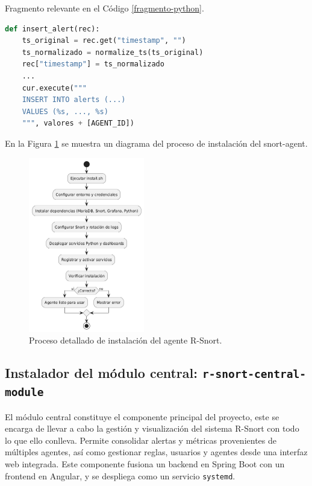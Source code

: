 \documentclass[11pt,a4paper,twoside]{report}
\begin{document}
Fragmento relevante en el Código \ref{fragmento-python}.

\begin{lstlisting}[language=Python, caption={Fragmento de inserción de alerta en ingest\_service.py.}, label={fragmento-python}]
	def insert_alert(rec):
	ts_original = rec.get("timestamp", "")
	ts_normalizado = normalize_ts(ts_original)
	rec["timestamp"] = ts_normalizado
	...
	cur.execute("""
	INSERT INTO alerts (...)
	VALUES (%s, ..., %s)
	""", valores + [AGENT_ID])
\end{lstlisting}

\newpage

En la Figura \ref{fig:bpmn-snort-agent} se muestra un diagrama del proceso de instalación del snort-agent.

\begin{figure}[H]
	\centering
	 \includegraphics[width=0.45\textwidth]{documento/29.png}
	\caption{Proceso detallado de instalación del agente R-Snort.}
	\label{fig:bpmn-snort-agent}
\end{figure}

\subsection{Instalador del módulo central: \texttt{r-snort-central-module}}

El módulo central constituye el componente principal del proyecto, este se encarga de llevar a cabo la gestión y visualización del sistema R-Snort con todo lo que ello conlleva. Permite consolidar alertas y métricas provenientes de múltiples agentes, así como gestionar reglas, usuarios y agentes desde una interfaz web integrada. Este componente fusiona un backend en Spring Boot con un frontend en Angular, y se despliega como un servicio \texttt{systemd}.
\end{document}
